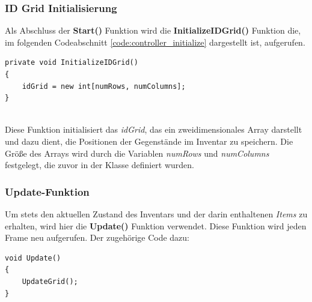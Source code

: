 \subsubsection{ID Grid Initialisierung}
Als Abschluss der \textbf{Start()} Funktion wird die \textbf{InitializeIDGrid()} Funktion die, im folgenden Codeabschnitt
\ref{code:controller_initialize} dargestellt ist, aufgerufen.
\begin{lstlisting}[style=csharp, caption={Initialisierung des idGrids}, label=code:controller_initialize]
private void InitializeIDGrid()
{
    idGrid = new int[numRows, numColumns];
}
\end{lstlisting}\\
Diese Funktion initialisiert das \textit{idGrid}, das ein zweidimensionales Array darstellt und dazu dient, die Positionen
der Gegenstände im Inventar zu speichern. Die Größe des Arrays wird durch die Variablen \textit{numRows} und \textit{numColumns}
festgelegt, die zuvor in der Klasse definiert wurden.

\subsubsection{Update-Funktion}
Um stets den aktuellen Zustand des Inventars und der darin enthaltenen \textit{Items} zu erhalten, wird hier die \textbf{Update()}
Funktion verwendet. Diese Funktion wird jeden Frame neu aufgerufen. Der zugehörige Code dazu:

\begin{lstlisting}[style=csharp, caption={Initialisierung des idGrids}, label=code:controller_update]
void Update()
{
    UpdateGrid();
}
\end{lstlisting}

